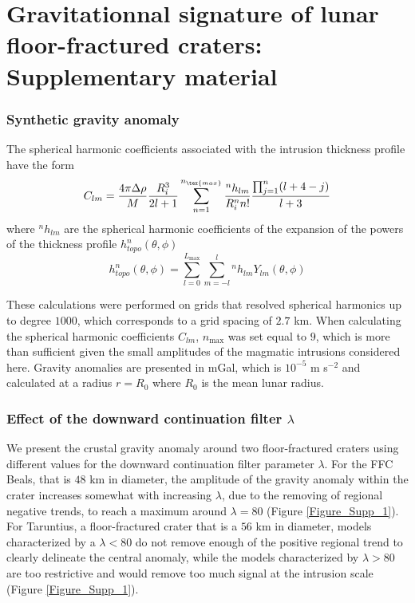 \chapter{Gravitationnal  signature of  lunar floor-fractured  craters:
  Supplementary material}
\label{chap:A5}

\subsection{Synthetic gravity anomaly}

The  spherical harmonic  coefficients  associated  with the  intrusion
thickness profile have the form
\begin{equation}
  C_{lm}=\frac{4\pi \Delta \rho}{M}\frac{R_i^3}{2l +1}\sum^{n_{\tex{max}}}_{n=1}\frac{^nh_{lm}}{R_i^n n!}\frac{\prod^n_{j=1}(l+4-j)}{l+3}
\end{equation}
where  $^nh_{lm}$  are  the  spherical harmonic  coefficients  of  the
expansion    of    the    powers     of    the    thickness    profile
$h_{topo}^n(\theta,\phi)$
\begin{equation}
  h^n_{topo}(\theta,\phi)= \sum_{l=0}^{L_{\text{max}}}\sum_{m=-l}^{l}{^n}h_{lm}Y_{lm}(\theta,\phi)
\end{equation}

These  calculations were  performed on  grids that  resolved spherical
harmonics up to degree $1000$, which  corresponds to a grid spacing of
$2.7$  km.   When  calculating  the  spherical  harmonic  coefficients
$C_{lm}$, $n_{\text{max}}$  was set equal  to $9$, which is  more than
sufficient  given  the small  amplitudes  of  the magmatic  intrusions
considered here.  Gravity anomalies  are presented  in mGal,  which is
$10^{-5}$ m s$^{-2}$ and calculated at a radius $r=R_0$ where $R_0$ is
the mean lunar radius.

\subsection{Effect of the downward continuation filter $\lambda$}
  
We  present the  crustal  gravity anomaly  around two  floor-fractured
craters using  different values  for the downward  continuation filter
parameter $\lambda$.  For the FFC Beals,  that is $48$ km in diameter,
the  amplitude of  the  gravity anomaly  within  the crater  increases
somewhat with  increasing $\lambda$, due  to the removing  of regional
negative  trends, to  reach a  maximum around  $\lambda =  80$ (Figure
\ref{Figure_Supp_1}). For Taruntius, a  floor-fractured crater that is
a $56$ km  in diameter, models characterized by a  $\lambda<80$ do not
remove enough of the positive  regional trend to clearly delineate the
central anomaly,  while the  models characterized by  $\lambda>80$ are
too  restrictive and  would remove  too much  signal at  the intrusion
scale (Figure \ref{Figure_Supp_1}).

